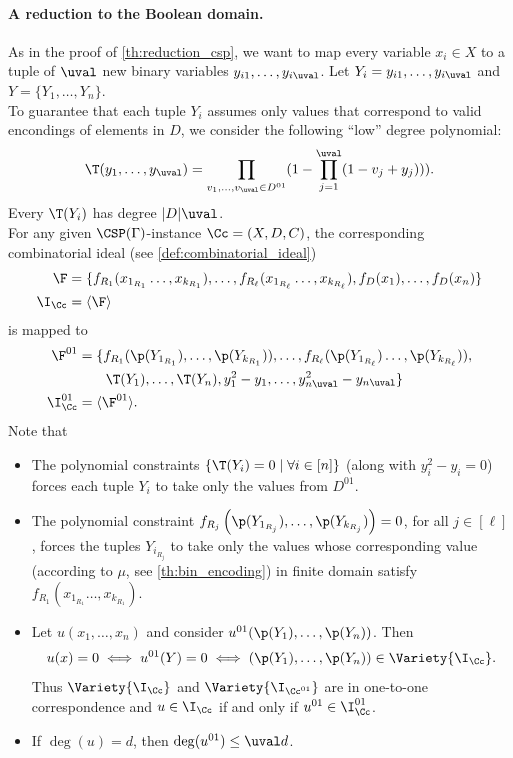 \documentclass[11pt]{article}
\begin{document}
\paragraph{A reduction to the Boolean domain.}
As in the proof of \cref{th:reduction_csp}, we want to map every variable $x_i\in X$ to a tuple of $\uval$ new binary variables $y_{i1},\ldots, y_{i\uval}$. Let $Y_i=y_{i1},\ldots, y_{i\uval}$ and $Y=\{Y_1,\ldots, Y_n\}$. \\
%
To guarantee that each tuple $Y_i$ assumes only values that correspond to valid encondings of elements in $D$, we consider the following ``low'' degree polynomial:
\begin{align*}
    \T(y_{1},\ldots, y_{\uval})=\prod_{v_1,\ldots,v_\uval\in D^{01}}(1-\prod_{j=1}^{\uval}(1-v_j+y_j))).
\end{align*}
Every $\T(Y_i)$ has degree $|D|\uval$. \\
%
%
For any given $\CSP(\Gamma)$-instance $\Cc=(X,D,C)$, the corresponding combinatorial ideal  (see \cref{def:combinatorial_ideal})  
%
\begin{align}
    \F&=\{f_{R_1}(x_{1_{R_1}}\ldots,x_{k_{R_1}}),\ldots,f_{R_\ell}(x_{1_{R_\ell}}\ldots,x_{k_{R_\ell}}),f_D(x_1),\ldots,f_D(x_n)\} \label{eq:F}\\
    \I_\Cc&=\langle \F\rangle
\end{align}
%
is mapped to
%
\begin{align}
 \F^{01}&=\{f_{R_1}(\p(Y_{1_{R_1}}),\ldots,\p(Y_{k_{R_1}})),\ldots,f_{R_\ell}(\p(Y_{1_{R_\ell}})\ldots,\p(Y_{k_{R_\ell}})),\nonumber\\ 
&\qquad \T(Y_1), \ldots,\T(Y_n),y_1^2-y_1,\ldots,y_{n\uval}^2-y_{n\uval}\} \label{eq:F01}\\ 
\I_\Cc^{01}&=\langle \F^{01}\rangle.
\end{align}
%
Note that 
\begin{itemize}
    \item The polynomial constraints $\{\T(Y_i)=0\mid \forall i\in [n]\}$ (along with $y_i^2-y_i=0$) forces each tuple $Y_i$ to take only the values from $D^{01}$.
    \item The polynomial constraint  $f_{R_j}\left(\p(Y_{1_{R_j}}),\ldots,\p(Y_{k_{R_j}})\right)=0$, for all $j\in [\ell]$, forces the tuples $Y_{i_{R_j}}$ to take only the values whose corresponding value (according to $\mu$, see \cref{th:bin_encoding}) in finite domain satisfy $f_{R_1}(x_{1_{R_1}}\ldots,x_{k_{R_1}})$.
    \item Let $u(x_1, \dots, x_n)$ and consider $u^{01}(\p(Y_1), \dots, \p(Y_n))$. Then
    \begin{align*}
        u(x) = 0 \iff u^{01}(Y) = 0 \iff (\p(Y_1), \dots, \p(Y_n)) \in \Variety{\I_\Cc}.
    \end{align*}
    Thus $\Variety{\I_\Cc}$ and $\Variety{\I_{\Cc^{01}}}$ are in one-to-one correspondence and $u \in \I_\Cc$ if and only if $u^{01} \in \I_{\Cc}^{01}$.
    \item If $\deg(u) = d$, then $\deg(u^{01}) \leq \uval d$.
\end{itemize}
\end{document}
